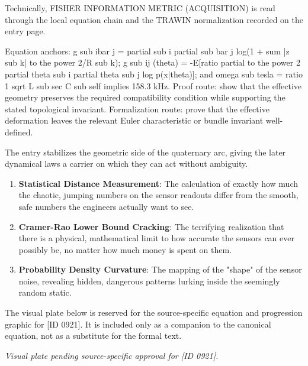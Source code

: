 Technically, FISHER INFORMATION METRIC (ACQUISITION) is read through the local equation chain and the TRAWIN normalization recorded on the entry page.

Equation anchors: g sub ibar j = partial sub i partial sub bar j log(1 + sum |z sub k| to the power 2/R sub k); g sub ij (theta) = -E[ratio partial to the power 2 partial theta sub i partial theta sub j log p(x|theta)]; and omega sub tesla = ratio 1 sqrt L sub sec C sub self implies 158.3 kHz. Proof route: show that the effective geometry preserves the required compatibility condition while supporting the stated topological invariant. Formalization route: prove that the effective deformation leaves the relevant Euler characteristic or bundle invariant well-defined.

The entry stabilizes the geometric side of the quaternary arc, giving the later dynamical laws a carrier on which they can act without ambiguity.
\endgroup

\begin{enumerate}[leftmargin=1.6em,itemsep=6pt,topsep=4pt]
\item \textbf{Statistical Distance Measurement}: The calculation of exactly how much the chaotic, jumping numbers on the sensor readouts differ from the smooth, safe numbers the engineers actually want to see.
\item \textbf{Cramer-Rao Lower Bound Cracking}: The terrifying realization that there is a physical, mathematical limit to how accurate the sensors can ever possibly be, no matter how much money is spent on them.
\item \textbf{Probability Density Curvature}: The mapping of the "shape" of the sensor noise, revealing hidden, dangerous patterns lurking inside the seemingly random static.
\end{enumerate}

\begingroup\footnotesize\sloppy
The visual plate below is reserved for the source-specific equation and progression graphic for [ID 0921]. It is included only as a companion to the canonical equation, not as a substitute for the formal text.
\par\endgroup
\begingroup\footnotesize\itshape
Visual plate pending source-specific approval for [ID 0921].
\par\endgroup


